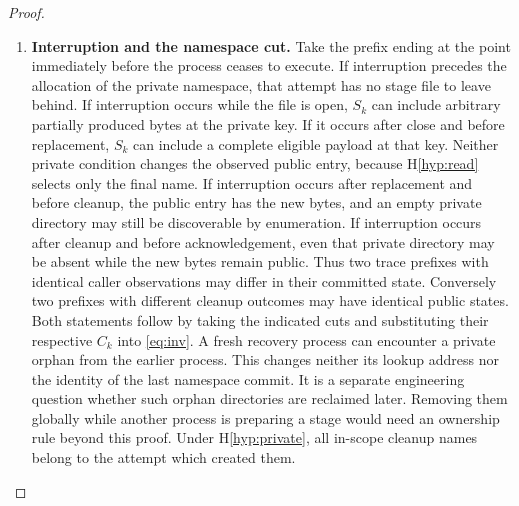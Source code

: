 \documentclass[12pt]{article}
\begin{document}
\begin{proof}
\begin{enumerate}
\item \textbf{Interruption and the namespace cut.}
Take the prefix ending at the point immediately before the
process ceases to execute.
If interruption precedes the allocation of the private namespace,
that attempt has no stage file to leave behind.
If interruption occurs while the file is open, $S_k$ can
include arbitrary partially produced bytes at the private key.
If it occurs after close and before replacement, $S_k$ can
include a complete eligible payload at that key.
Neither private condition changes the observed public entry,
because H\ref{hyp:read} selects only the final name.
If interruption occurs after replacement and before cleanup,
the public entry has the new bytes, and an empty private
directory may still be discoverable by enumeration.
If interruption occurs after cleanup and before acknowledgement,
even that private directory may be absent while the new bytes
remain public.
Thus two trace prefixes with identical caller observations
may differ in their committed state.
Conversely two prefixes with different cleanup outcomes may
have identical public states.
Both statements follow by taking the indicated cuts and
substituting their respective $C_k$ into \eqref{eq:inv}.
A fresh recovery process can encounter a private orphan from
the earlier process. This changes neither its lookup address
nor the identity of the last namespace commit.
It is a separate engineering question whether such orphan
directories are reclaimed later.
Removing them globally while another process is preparing a
stage would need an ownership rule beyond this proof.
Under H\ref{hyp:private}, all in-scope cleanup names belong
to the attempt which created them.


\end{enumerate}
\end{proof}
\end{document}
